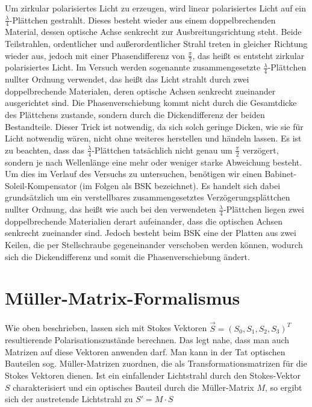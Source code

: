 \documentclass[bigchapter,colorback,accentcolor=tud4b,linedtoc,11pt]{tudreport}
\begin{document}
\vspace{\baselineskip}Um zirkular polarisiertes Licht zu erzeugen, wird linear polarisiertes Licht auf ein $\frac{\lambda}{4}$-Plättchen gestrahlt. Dieses besteht wieder aus einem doppelbrechenden Material, dessen optische Achse senkrecht zur Ausbreitungsrichtung steht. Beide Teilstrahlen, ordentlicher und außerordentlicher Strahl treten in gleicher Richtung wieder aus, jedoch mit einer Phasendifferenz von $\frac{\pi}{2}$, das heißt es entsteht zirkular polarisiertes Licht. Im Versuch werden sogenannte zusammengesetzte $\frac{\lambda}{4}$-Plättchen nullter Ordnung verwendet, das heißt das Licht strahlt durch zwei doppelbrechende Materialen, deren optische Achsen senkrecht zueinander ausgerichtet sind. Die Phasenverschiebung kommt nicht durch die Gesamtdicke des Plättchens zustande, sondern durch die Dickendifferenz der beiden Bestandteile. Dieser Trick ist notwendig, da sich solch geringe Dicken, wie sie für Licht notwendig wären, nicht ohne weiteres herstellen und händeln lassen. Es ist zu beachten, dass das $\frac{\lambda}{4}$-Plättchen tatsächlich nicht genau um $\frac{\pi}{2}$ verzögert, sondern je nach Wellenlänge eine mehr oder weniger starke Abweichung besteht. Um dies im Verlauf des Versuchs zu untersuchen, benötigen wir einen Babinet-Soleil-Kompensator (im Folgen als BSK bezeichnet). Es handelt sich dabei grundsätzlich um ein verstellbares zusammengesetztes Verzögerungsplättchen nullter Ordnung, das heißt wie auch bei den verwendeten $\frac{\lambda}{4}$-Plättchen liegen zwei doppelbrechende Materialien derart aufeinander, dass die optischen Achsen senkrecht zueinander sind. Jedoch besteht beim BSK eine der Platten aus zwei Keilen, die per Stellschraube gegeneinander verschoben werden können, wodurch sich die Dickendifferenz und somit die Phasenverschiebung ändert. 

\section{Müller-Matrix-Formalismus}
Wie oben beschrieben, lassen sich mit Stokes Vektoren $\vec{S}= (S_0, S_1, S_2, S_3)^T$ resultierende Polarisationszustände berechnen. Das legt nahe, dass man auch Matrizen auf diese Vektoren anwenden darf. Man kann in der Tat optischen Bauteilen sog. Müller-Matrizen zuordnen, die als Transformationsmatrizen für die Stokes Vektoren dienen. Ist ein einfallender Lichtstrahl durch den Stokes-Vektor $S$ charakterisiert und ein optisches Bauteil durch die Müller-Matrix $M$, so ergibt sich der austretende Lichtstrahl zu $S' = M \cdot S$ 
\end{document}
